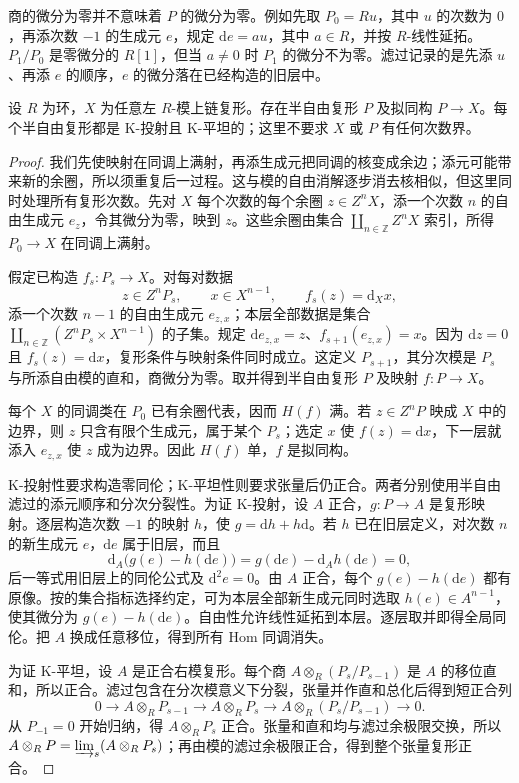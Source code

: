 商的微分为零并不意味着 \(P\) 的微分为零。例如先取 \(P_0=Ru\)，其中 \(u\) 的次数为 \(0\)，再添次数 \(-1\) 的生成元 \(e\)，规定 \(\mathrm{d}e=au\)，其中 \(a\in R\)，并按 \(R\)-线性延拓。\(P_1/P_0\) 是零微分的 \(R[1]\)，但当 \(a\ne0\) 时 \(P_1\) 的微分不为零。滤过记录的是先添 \(u\)、再添 \(e\) 的顺序，\(e\) 的微分落在已经构造的旧层中。

\begin{theorem}\label{b4:thm:semifree-resolution}
	设 \(R\) 为环，\(X\) 为任意左 \(R\)-模上链复形。存在半自由复形 \(P\) 及拟同构 \(P\to X\)。每个半自由复形都是 K-投射且 K-平坦的；这里不要求 \(X\) 或 \(P\) 有任何次数界。
\end{theorem}
\begin{proof}
	我们先使映射在同调上满射，再添生成元把同调的核变成余边；添元可能带来新的余圈，所以须重复后一过程。这与模的自由消解逐步消去核相似，但这里同时处理所有复形次数。先对 \(X\) 每个次数的每个余圈 \(z\in Z^nX\)，添一个次数 \(n\) 的自由生成元 \(e_z\)，令其微分为零，映到 \(z\)。这些余圈由集合 \(\coprod_{n\in\mathbb Z}Z^nX\) 索引，所得 \(P_0\to X\) 在同调上满射。

	假定已构造 \(f_s:P_s\to X\)。对每对数据
	\[
		z\in Z^nP_s,\qquad x\in X^{n-1},\qquad f_s(z)=\mathrm{d}_Xx,
	\]
	添一个次数 \(n-1\) 的自由生成元 \(e_{z,x}\)；本层全部数据是集合 \(\coprod_{n\in\mathbb Z}(Z^nP_s\times X^{n-1})\) 的子集。规定 \(\mathrm{d} e_{z,x}=z\)、\(f_{s+1}(e_{z,x})=x\)。因为 \(\mathrm{d}z=0\) 且 \(f_s(z)=\mathrm{d}x\)，复形条件与映射条件同时成立。这定义 \(P_{s+1}\)，其分次模是 \(P_s\) 与所添自由模的直和，商微分为零。取并得到半自由复形 \(P\) 及映射 \(f:P\to X\)。

	每个 \(X\) 的同调类在 \(P_0\) 已有余圈代表，因而 \(H(f)\) 满。若 \(z\in Z^nP\) 映成 \(X\) 中的边界，则 \(z\) 只含有限个生成元，属于某个 \(P_s\)；选定 \(x\) 使 \(f(z)=\mathrm{d}x\)，下一层就添入 \(e_{z,x}\) 使 \(z\) 成为边界。因此 \(H(f)\) 单，\(f\) 是拟同构。

	K-投射性要求构造零同伦；K-平坦性则要求张量后仍正合。两者分别使用半自由滤过的添元顺序和分次分裂性。为证 K-投射，设 \(A\) 正合，\(g:P\to A\) 是复形映射。逐层构造次数 \(-1\) 的映射 \(h\)，使 \(g=\mathrm{d}h+h\mathrm{d}\)。若 \(h\) 已在旧层定义，对次数 \(n\) 的新生成元 \(e\)，\(\mathrm{d}e\) 属于旧层，而且
	\[
		\mathrm{d}_A\bigl(g(e)-h(\mathrm{d}e)\bigr)=g(\mathrm{d}e)-\mathrm{d}_Ah(\mathrm{d}e)=0,
	\]
	后一等式用旧层上的同伦公式及 \(\mathrm{d}^2e=0\)。由 \(A\) 正合，每个 \(g(e)-h(\mathrm{d}e)\) 都有原像。按的集合指标选择约定，可为本层全部新生成元同时选取 \(h(e)\in A^{n-1}\)，使其微分为 \(g(e)-h(\mathrm{d}e)\)。自由性允许线性延拓到本层。逐层取并即得全局同伦。把 \(A\) 换成任意移位，得到所有 Hom 同调消失。

	为证 K-平坦，设 \(A\) 是正合右模复形。每个商 \(A\otimes_R(P_s/P_{s-1})\) 是 \(A\) 的移位直和，所以正合。滤过包含在分次模意义下分裂，张量并作直和总化后得到短正合列
	\[
		0\longrightarrow A\otimes_RP_{s-1}\longrightarrow A\otimes_RP_s \longrightarrow A\otimes_R(P_s/P_{s-1})\longrightarrow0.
	\]
	从 \(P_{-1}=0\) 开始归纳，得 \(A\otimes_RP_s\) 正合。张量和直和均与滤过余极限交换，所以 \(A\otimes_RP=\varinjlim_s(A\otimes_RP_s)\)；再由模的滤过余极限正合，得到整个张量复形正合。
\end{proof}

